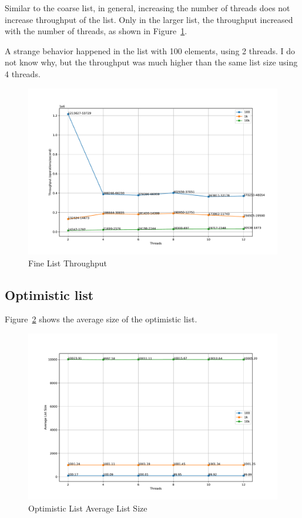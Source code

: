 \documentclass{article}
\begin{document}
Similar to the coarse list, in general, increasing the number of threads does not increase throughput of the list. Only in the larger list, the throughput increased with the number of threads, as shown in Figure~\ref{fig:fine-throughput}.

A strange behavior happened in the list with 100 elements, using 2 threads. I do not know why, but the throughput was much higher than the same list size using 4 threads.

\begin{figure}[H]
    \centering
    \includegraphics[width=\textwidth]{../test/plots/FineListThroughput.pdf}
    \caption{Fine List Throughput}
    \label{fig:fine-throughput}
\end{figure}

\subsection{Optimistic list}

Figure~\ref{fig:optimistic-size} shows the average size of the optimistic list.

\begin{figure}[H]
    \centering
    \includegraphics[scale=0.4]{../test/plots/OptimisticListAverageListSize.pdf}
    \caption{Optimistic List Average List Size}
    \label{fig:optimistic-size}
\end{figure}
\end{document}
